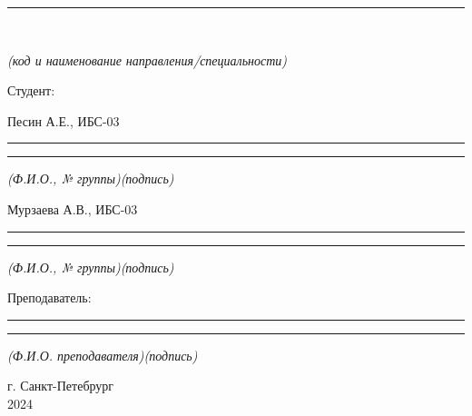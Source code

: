 \begin{titlepage}
\begin{center}
     \specialty
     \vspace{-3ex}
     \rule{\textwidth}{0.5pt}\\
     \vspace{-2ex}
     \begin{footnotesize}
        \textit{(код и наименование направления/специальности)}
     \end{footnotesize}

    \vspace{3ex}

    \begin{flushright}
      \begin{minipage}{0.5\textwidth}
        Студент:

	\vspace{2ex}

	Песин А.Е., ИБС-03\hfill
	\vspace{-3ex}
	\rule{23ex}{0.5pt}\hfill\rule{10ex}{0.5pt}
	\vspace{-2ex}

        \begin{footnotesize}
	  \hspace{6ex}\textit{(Ф.И.О., № группы)\hfill(подпись)\hspace{3ex}}
        \end{footnotesize}

	Мурзаева А.В., ИБС-03\hfill
	\vspace{-3ex}
	\rule{23ex}{0.5pt}\hfill\rule{10ex}{0.5pt}
	\vspace{-2ex}

        \begin{footnotesize}
	  \hspace{6ex}\textit{(Ф.И.О., № группы)\hfill(подпись)\hspace{3ex}}
        \end{footnotesize}

	\vspace{2ex}

        Преподаватель:

	\teacher\hfill
	\vspace{-3ex}
	\rule{23ex}{0.5pt}\hfill\rule{10ex}{0.5pt}
	\vspace{-2ex}

        \begin{footnotesize}
	  \hspace{4ex}\textit{(Ф.И.О. преподавателя)\hfill(подпись)\hspace{3ex}}
        \end{footnotesize}
      \end{minipage}
    \end{flushright}

    \vfill

    г. Санкт-Петебрург\\
    2024
  \end{center}
\end{titlepage}

